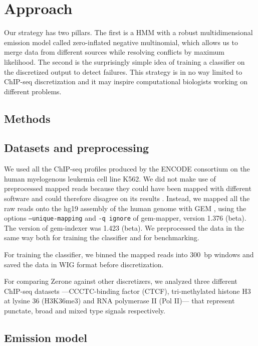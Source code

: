 \documentclass{bioinfo}
\begin{document}
\section{Approach}
Our strategy has two pillars. The first is a HMM with a robust multidimensional
emission model called zero-inflated negative multinomial, which allows us to
merge data from different sources while resolving conflicts by maximum
likelihood. The second is the surprisingly simple idea of training a classifier
on the discretized output to detect failures. This strategy is in no way limited
to ChIP-seq discretization and it may inspire computational biologists working
on different problems.

\begin{methods}
\section{Methods}

\subsection{Datasets and preprocessing}
We used all the ChIP-seq profiles produced by the ENCODE consortium on the human
myelogenous leukemia cell line K562. We did not make use of preprocessed mapped
reads because they could have been mapped with different software and could
therefore disagree on its results \citep{Szalkowski2011}. Instead, we mapped all
the raw reads onto the hg19 assembly of the human genome with GEM
\citep{Marco-Sola2012}, using the options \texttt{--unique-mapping} and
\texttt{-q ignore} of gem-mapper, version 1.376 (beta). The version of
gem-indexer was 1.423 (beta). We preprocessed the data in the same
way both for training the classifier and for benchmarking.

For training the classifier, we binned the mapped reads into 300~bp windows and
saved the data in WIG format before discretization.

For comparing Zerone against other discretizers, we analyzed three different
ChIP-seq datasets ---CCCTC-binding factor (CTCF), tri-methylated histone H3 at
lysine 36 (H3K36me3) and RNA polymerase II (Pol II)--- that represent punctate,
broad and mixed type signals respectively.

\subsection{Emission model}


\end{methods}
\end{document}
